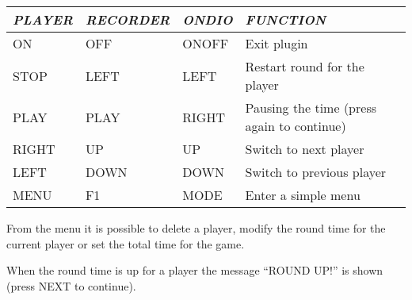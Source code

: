\begin{center}\begin{tabular}{|p{1.917cm}|p{2.7649999cm}|p{1.7049999cm}|p{9.433001cm}|}
\hline
{\centering\bfseries\itshape
PLAYER 
\par}
&
{\centering\bfseries\itshape
RECORDER 
\par}
&
{\centering\bfseries\itshape
ONDIO 
\par}
&
{\centering\bfseries\itshape
FUNCTION 
\par}
\\\hline
{\centering
ON 
\par}
&
{\centering
OFF 
\par}
&
{\centering
ONOFF 
\par}
&
Exit plugin 
\\\hline
{\centering
STOP 
\par}
&
{\centering
LEFT 
\par}
&
{\centering
LEFT 
\par}
&
Restart round for the player 
\\\hline
{\centering
PLAY 
\par}
&
{\centering
PLAY 
\par}
&
{\centering
RIGHT 
\par}
&
Pausing the time (press again to continue) 
\\\hline
{\centering
RIGHT 
\par}
&
{\centering
UP 
\par}
&
{\centering
UP 
\par}
&
Switch to next player 
\\\hline
{\centering
LEFT 
\par}
&
{\centering
DOWN 
\par}
&
{\centering
DOWN 
\par}
&
Switch to previous player 
\\\hline
{\centering
MENU 
\par}
&
{\centering
F1 
\par}
&
{\centering
MODE 
\par}
&
Enter a simple menu 
\\\hline
\end{tabular}\end{center}
From the menu it is possible to delete a player, modify the round time
for the current player or set the total time for the game. 

When the round time is up for a player the message ``ROUND UP!'' is shown (press  NEXT to continue). 

